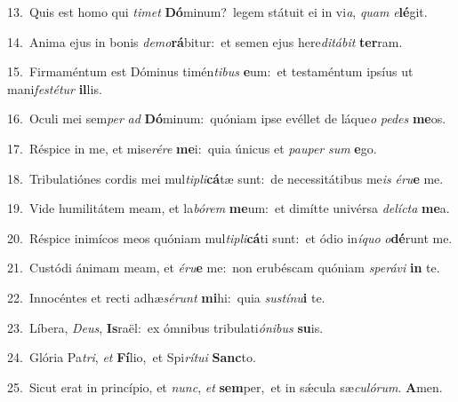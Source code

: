 {\numbfont\textcolor{\numbcolor}{13.}}~Quis est homo qui \textit{ti}\-\textit{met} \textbf{Dó}\-minum?~\star legem státuit ei in vi\-\textit{a}\-, \textit{quam} \textit{e}\-\textbf{lé}git.\par
{\numbfont\textcolor{\numbcolor}{14.}}~Anima ejus in bonis \textit{de}\-\textit{mo}\textbf{rá}bitur:~\star et semen ejus here\-\textit{di}\-\textit{tá}\textit{bit} \textbf{ter}\-ram.\par
{\numbfont\textcolor{\numbcolor}{15.}}~Firmaméntum est Dóminus timén\-\textit{ti}\-\textit{bus} \textbf{e}\-um:~\star et testaméntum ipsíus ut mani\-\textit{fes}\-\textit{té}\textit{tur} \textbf{il}\-lis.\par
{\numbfont\textcolor{\numbcolor}{16.}}~Oculi mei sem\textit{per} \textit{ad} \textbf{Dó}\-minum:~\star quóniam ipse evéllet de láque\textit{o} \textit{pe}\-\textit{des} \textbf{me}\-os.\par
{\numbfont\textcolor{\numbcolor}{17.}}~Réspice in me, et mise\-\textit{ré}\-\textit{re} \textbf{me}\-i:~\star quia únicus et \textit{pau}\-\textit{per} \textit{sum} \textbf{e}\-go.\par
{\numbfont\textcolor{\numbcolor}{18.}}~Tribulatiónes cordis mei mul\-\textit{ti}\-\textit{pli}\textbf{cá}tæ sunt:~\star de necessitátibus me\textit{is} \textit{é}\-\textit{ru}\textbf{e} me.\par
{\numbfont\textcolor{\numbcolor}{19.}}~Vide humilitátem meam, et la\-\textit{bó}\-\textit{rem} \textbf{me}\-um:~\star et dimítte univérsa \textit{de}\-\textit{líc}\textit{ta} \textbf{me}\-a.\par
{\numbfont\textcolor{\numbcolor}{20.}}~Réspice inimícos meos quóniam mul\-\textit{ti}\-\textit{pli}\textbf{cá}ti sunt:~\star et ódio in\-\textit{í}\-\textit{quo} \textit{o}\-\textbf{dé}runt me.\par
{\numbfont\textcolor{\numbcolor}{21.}}~Custódi ánimam meam, et \textit{é}\-\textit{ru}\textbf{e} me:~\star non erubéscam quóniam \textit{spe}\-\textit{rá}\textit{vi} \textbf{in} te.\par
{\numbfont\textcolor{\numbcolor}{22.}}~Innocéntes et recti adhæ\-\textit{sé}\-\textit{runt} \textbf{mi}\-hi:~\star quia \textit{sus}\-\textit{tí}\textit{nu}\textbf{i} te.\par
{\numbfont\textcolor{\numbcolor}{23.}}~Líbera, \textit{De}\-\textit{us}, \textbf{Is}\-raël:~\star ex ómnibus tribulati\-\textit{ó}\-\textit{ni}\textit{bus} \textbf{su}\-is.\par
{\numbfont\textcolor{\numbcolor}{24.}}~Glória Pa\-\textit{tri}\-, \textit{et} \textbf{Fí}\-lio,~\star et Spi\-\textit{rí}\-\textit{tu}\textit{i} \textbf{Sanc}\-to.\par
{\numbfont\textcolor{\numbcolor}{25.}}~Sicut erat in princípio, et \textit{nunc}\-, \textit{et} \textbf{sem}\-per,~\star et in sǽcula sæ\-\textit{cu}\-\textit{ló}\textit{rum}. \textbf{A}\-men.\par
